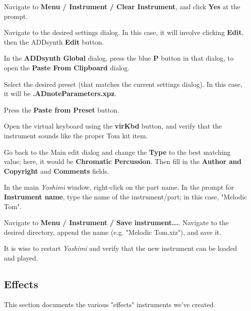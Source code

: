       \begin{enumber}
         \item Navigate to \textbf{Menu / Instrument / Clear Instrument}, and
            click \textbf{Yes} at the prompt.
         \item Navigate to the desired settings dialog.  In this case, it
            will involve clicking \textbf{Edit}, then the ADDsynth
            \textbf{Edit} button.
         \item In the \textbf{ADDsynth Global} dialog,
            press the blue \textbf{P} button in that dialog,
            to open the \textbf{Paste From Clipboard} dialog.
         \item Select the desired preset (that matches the current settings
            dialog).  In this case, it will be
            \textbf{.ADnoteParameters.xpz}.
         \item Press the \textbf{Paste from Preset} button.
         \item Open the virtual keyboard using the \textbf{virKbd} button,
            and verify that the instrument sounds like the proper Tom kit
            item.
         \item Go back to the Main edit dialog and change the \textbf{Type}
            to the best matching value; here, it would be
            \textbf{Chromatic Percussion}.  Then fill in the
            \textbf{Author and Copyright} and \textbf{Comments} fields.
         \item In the main \textsl{Yoshimi} window, right-click on the part
            name.  In the prompt for \textbf{Instrument name}, type the name
            of the instrument/part; in this case, "Melodic Tom".
         \item Navigate to
            \textbf{Menu / Instrument / Save instrument...}.
            Navigate to the desired directory, append the name (e.g.
            "Melodic Tom.xiz"), and save it.
      \end{enumber}

   It is wise to restart \textsl{Yoshimi} and verify that the new instrument
   can be loaded and played.

\subsection{Effects}
\label{subsec:cookbook_instruments_effects}

   This section documents the various "effects" instruments we've created.

